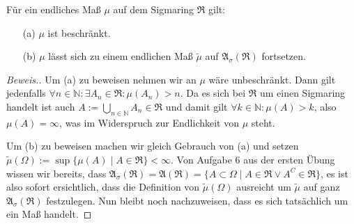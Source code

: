 \begin{lemma}
    Für ein endliches Maß $\mu$ auf dem Sigmaring $\mathfrak{R}$ gilt:
    \begin{itemize}
        \item[(a)] $\mu$ ist beschränkt.
        \item[(b)] $\mu$ lässt sich zu einem endlichen Maß $\tilde{\mu}$ auf $\mathfrak{A}_\sigma(\mathfrak{R})$ fortsetzen.
    \end{itemize}
\end{lemma}
\begin{proof}[Beweis.]
    Um (a) zu beweisen nehmen wir an $\mu$ wäre unbeschränkt. Dann gilt jedenfalls $\forall n\in\mathbb{N}:\exists A_n\in\mathfrak{R}:\mu(A_n)>n$. Da es sich bei $\mathfrak{R}$ um einen Sigmaring handelt ist auch $A:=\bigcup_{n\in\mathbb{N}}A_n\in\mathfrak{R}$ und damit gilt $\forall k\in\mathbb{N}:\mu(A)>k$, also $\mu(A)=\infty$, was im Widerspruch zur Endlichkeit von $\mu$ steht.

    Um (b) zu beweisen machen wir gleich Gebrauch von (a) und setzen $\tilde{\mu}(\Omega):=\sup\{\mu(A)\mid A\in\mathfrak{R}\}<\infty$. Von Aufgabe 6 aus der ersten Übung wissen wir bereits, dass $\mathfrak{A}_\sigma(\mathfrak{R})=\mathfrak{A}(\mathfrak{R})=\{A\subset\Omega\mid A\in\mathfrak{R}\lor A^C\in\mathfrak{R}\}$, es ist also sofort ersichtlich, dass die Definition von $\tilde{\mu}(\Omega)$ ausreicht um $\tilde{\mu}$ auf ganz $\mathfrak{A}_\sigma(\mathfrak{R})$ festzulegen. Nun bleibt noch nachzuweisen, dass es sich tatsächlich um ein Maß handelt.
\end{proof}